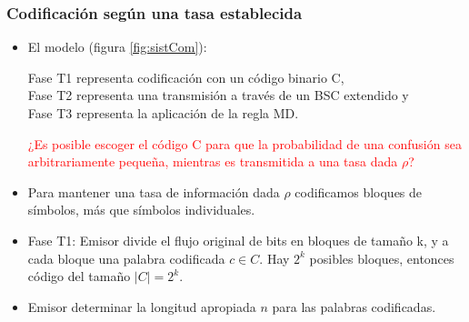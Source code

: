 \documentclass{beamer}
\theoremstyle{plain}
\theoremstyle{example}
\theoremstyle{example}
\begin{document}
\begin{frame} \frametitle{Codificación según una tasa establecida} \small  
\begin{itemize}

 \item  El modelo (figura \ref{fig:sistCom}): 
 
 Fase T1 representa codificación con un código binario C, \\
 Fase T2 representa una transmisión a través de un BSC extendido y\\ 
 Fase T3 representa la aplicación de la regla MD.\\
 
 \begin{center}
\textcolor{red}{¿Es posible escoger el código C para que la probabilidad de una confusión sea arbitrariamente pequeña, mientras es transmitida a una tasa dada $\rho$?}
\end{center}

\item  Para mantener una tasa de información dada $\rho$ codificamos bloques de símbolos, más que símbolos individuales. 

\item Fase T1: Emisor divide el flujo original de bits en bloques de tamaño k, y a cada bloque una palabra codificada $c \in C$. Hay $2^k$ posibles bloques, entonces código del tamaño $|C| = 2^k$.

\item Emisor determinar la longitud apropiada $n$ para las palabras codificadas. 

\end{itemize} \end{frame} 
\end{document}
